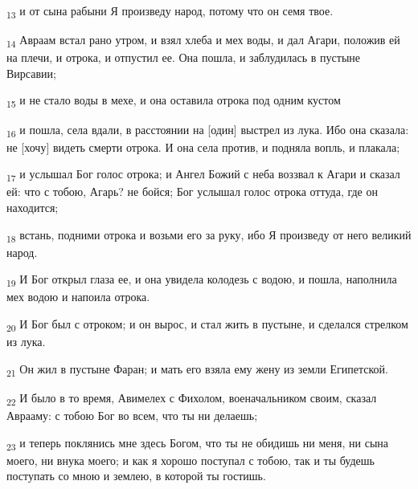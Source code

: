 \begin{tcolorbox}
\textsubscript{13} и от сына рабыни Я произведу народ, потому что он семя твое.
\end{tcolorbox}
\begin{tcolorbox}
\textsubscript{14} Авраам встал рано утром, и взял хлеба и мех воды, и дал Агари, положив ей на плечи, и отрока, и отпустил ее. Она пошла, и заблудилась в пустыне Вирсавии;
\end{tcolorbox}
\begin{tcolorbox}
\textsubscript{15} и не стало воды в мехе, и она оставила отрока под одним кустом
\end{tcolorbox}
\begin{tcolorbox}
\textsubscript{16} и пошла, села вдали, в расстоянии на [один] выстрел из лука. Ибо она сказала: не [хочу] видеть смерти отрока. И она села против, и подняла вопль, и плакала;
\end{tcolorbox}
\begin{tcolorbox}
\textsubscript{17} и услышал Бог голос отрока; и Ангел Божий с неба воззвал к Агари и сказал ей: что с тобою, Агарь? не бойся; Бог услышал голос отрока оттуда, где он находится;
\end{tcolorbox}
\begin{tcolorbox}
\textsubscript{18} встань, подними отрока и возьми его за руку, ибо Я произведу от него великий народ.
\end{tcolorbox}
\begin{tcolorbox}
\textsubscript{19} И Бог открыл глаза ее, и она увидела колодезь с водою, и пошла, наполнила мех водою и напоила отрока.
\end{tcolorbox}
\begin{tcolorbox}
\textsubscript{20} И Бог был с отроком; и он вырос, и стал жить в пустыне, и сделался стрелком из лука.
\end{tcolorbox}
\begin{tcolorbox}
\textsubscript{21} Он жил в пустыне Фаран; и мать его взяла ему жену из земли Египетской.
\end{tcolorbox}
\begin{tcolorbox}
\textsubscript{22} И было в то время, Авимелех с Фихолом, военачальником своим, сказал Аврааму: с тобою Бог во всем, что ты ни делаешь;
\end{tcolorbox}
\begin{tcolorbox}
\textsubscript{23} и теперь поклянись мне здесь Богом, что ты не обидишь ни меня, ни сына моего, ни внука моего; и как я хорошо поступал с тобою, так и ты будешь поступать со мною и землею, в которой ты гостишь.
\end{tcolorbox}
